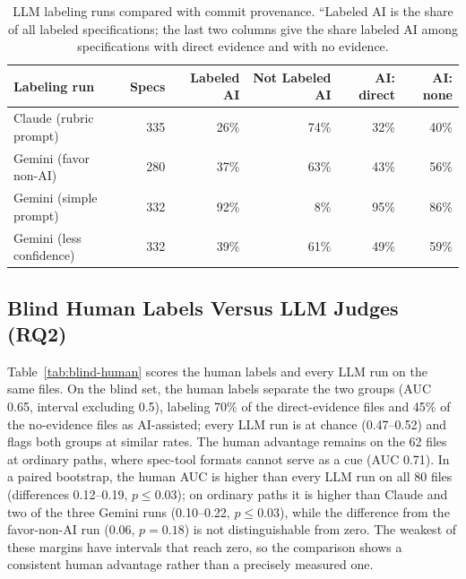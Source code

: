 \documentclass{article}
\begin{document}
\begin{table}[ht]
\centering
\caption{LLM labeling runs compared with commit provenance. ``Labeled AI is the share of all labeled specifications; the last two columns give the share labeled AI among specifications with direct evidence and with no evidence.}
\label{tab:llm-vs-provenance}
\begin{tabular}{lrrrrr}
\toprule
Labeling run & Specs & Labeled AI & Not Labeled AI & AI: direct & AI: none \\
\midrule
Claude (rubric prompt) & 335 & 26\% & 74\% & 32\% & 40\% \\
Gemini (favor non-AI) & 280 & 37\% & 63\% & 43\% & 56\% \\
Gemini (simple prompt) & 332 & 92\% & 8\% & 95\% & 86\%\\
Gemini (less confidence) & 332 & 39\% & 61\% & 49\% & 59\% \\
\bottomrule
\end{tabular}
\end{table}

\subsection{Blind Human Labels Versus LLM Judges (RQ2)}
Table~\ref{tab:blind-human} scores the human labels and every LLM run on the same files. On the blind set, the human labels separate the two groups (AUC 0.65, interval excluding 0.5), labeling 70\% of the direct-evidence files and 45\% of the no-evidence files as AI-assisted; every LLM run is at chance (0.47--0.52) and flags both groups at similar rates. The human advantage remains on the 62 files at ordinary paths, where spec-tool formats cannot serve as a cue (AUC 0.71). In a paired bootstrap, the human AUC is higher than every LLM run on all 80 files (differences 0.12--0.19, $p \le 0.03$); on ordinary paths it is higher than Claude and two of the three Gemini runs (0.10--0.22, $p \le 0.03$), while the difference from the favor-non-AI run (0.06, $p = 0.18$) is not distinguishable from zero. The weakest of these margins have intervals that reach zero, so the comparison shows a consistent human advantage rather than a precisely measured one.
\end{document}
